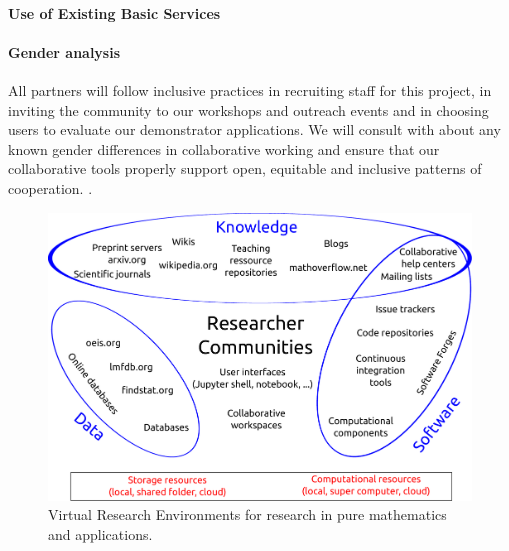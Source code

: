 \paragraph{Use of Existing Basic Services}

\paragraph{Gender analysis}

All partners will follow inclusive practices in recruiting staff for
this project, in inviting the community to our workshops and outreach
events and in choosing users to evaluate our demonstrator
applications. We will consult with  about any known gender differences in
collaborative working and ensure that our collaborative tools properly
support open, equitable and inclusive patterns of cooperation. 
.


\begin{figure}
  \centerline{\includegraphics[width=\textwidth]{Pictures/TheBigPicture.pdf}}
  \caption{Virtual Research Environments for research in pure
    mathematics and applications.}
  \label{fig:thebigpicture}
\end{figure}

